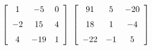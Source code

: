 {$\left[ \begin {array}{ccc} 1&-5&0\\\noalign{\medskip}-2&15&4
\\\noalign{\medskip}4&-19&1\end {array} \right]$ 
}
{$ \left[ \begin {array}{ccc} 91&5&-20\\\noalign{\medskip}18&1&-4
\\\noalign{\medskip}-22&-1&5\end {array} \right]$}
